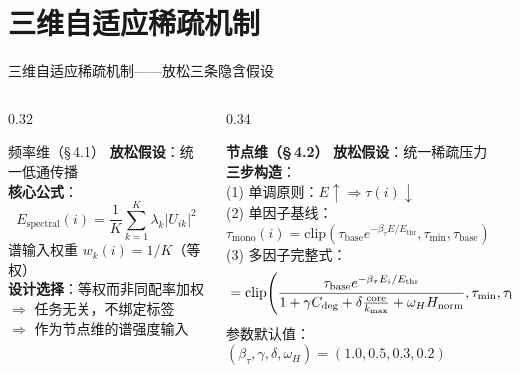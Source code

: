 \documentclass[aspectratio=169,9pt,xcolor=dvipsnames]{beamer}
\newcommand{\highlight}[1]{\textcolor{myred}{\textbf{#1}}}
\newcommand{\blue}[1]{\textcolor{mynavy}{#1}}
\newcommand{\chapternote}{}
\newif\ifshowchapternote
\newcommand{\setchapternote}[1]{%
  \renewcommand{\chapternote}{#1}%
  \showchapternotetrue
}
\begin{document}
\section{三维自适应稀疏机制}
\setchapternote{第4章}

\begin{frame}{三维自适应稀疏机制——放松三条隐含假设}
\begin{columns}[T]

\begin{column}{0.32\textwidth}
  \begin{block}{\blue{频率维（§\,4.1）}}
    \small
    \textbf{放松假设}：统一低通传播\\[4pt]
    \textbf{核心公式}：
    \begin{equation*}
      E_{\mathrm{spectral}}(i)
      =\frac{1}{K}\sum_{k=1}^{K}\lambda_k|U_{ik}|^2
    \end{equation*}
    谱输入权重 $w_k(i)=1/K$（等权）\\[4pt]
    \textbf{设计选择}：等权而非同配率加权\\
    $\Rightarrow$ 任务无关，不绑定标签\\
    $\Rightarrow$ 作为节点维的谱强度输入
  \end{block}
\end{column}

\begin{column}{0.34\textwidth}
  \begin{alertblock}{\highlight{节点维（§\,4.2）}}
    \small
    \textbf{放松假设}：统一稀疏压力\\[4pt]
    \textbf{三步构造}：\\
    (1) 单调原则：$E\uparrow\Rightarrow\tau(i)\downarrow$\\
    (2) 单因子基线：$\tau_{\mathrm{mono}}(i)=\mathrm{clip}(\tau_{\mathrm{base}} e^{-\beta_\tau E/E_{\mathrm{thr}}},\tau_{\min},\tau_{\mathrm{base}})$\\[2pt]
    (3) 多因子完整式：
    {\tiny
    \begin{equation*}
      \hspace{-0.6cm}\tau(i)=\mathrm{clip}\!\left(
      \frac{\tau_{\mathrm{base}} e^{-\beta_\tau E_i/E_{\mathrm{thr}}}}
           {1+\gamma C_{\mathrm{deg}}+\delta\frac{\mathrm{core}}{k_{\max}}+\omega_H H_{\mathrm{norm}}},
      \tau_{\min},\tau_{\mathrm{base}}\!\right)
    \end{equation*}
    }
    参数默认值：$(\beta_\tau,\gamma,\delta,\omega_H)=(1.0,0.5,0.3,0.2)$
  \end{alertblock}
\end{column}


\end{columns}
\end{frame}
\end{document}
